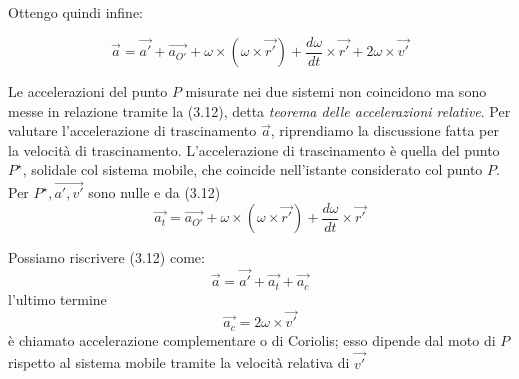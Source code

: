 \documentclass[class=book, crop=false, oneside, 12pt]{standalone}
\begin{document}
Ottengo quindi infine:

\begin{equation}
    \overrightarrow{a} = \overrightarrow{a'} + \overrightarrow{a_{O'}} + \omega \times ( \omega \times \overrightarrow{r'}) + \frac{d \omega}{dt} \times \overrightarrow{r'} + 2 \omega \times \overrightarrow{v'}
\end{equation}

Le accelerazioni del punto \(P\) misurate nei due sistemi non coincidono ma sono messe in relazione tramite la (3.12), detta \emph{teorema delle accelerazioni relative}.
Per valutare l'accelerazione di trascinamento \(\overrightarrow{a}\), riprendiamo la discussione fatta per la velocità di trascinamento. 
L'accelerazione di trascinamento è quella del punto \(P^{\star}\), solidale col sistema mobile, che coincide nell'istante considerato col punto \(P\). 
Per \(P^{\star}, \overrightarrow{a', v'}\) sono nulle e da (3.12)
\begin{equation}
    \overrightarrow{a_t} = \overrightarrow{a_{O'}} + \omega \times (\omega \times \overrightarrow{r'}) + \frac{d \omega }{dt} \times \overrightarrow{r'}
\end{equation}

Possiamo riscrivere (3.12) come:
\begin{equation*}
    \overrightarrow{a} = \overrightarrow{a'} + \overrightarrow{a_t} + \overrightarrow{a_c}
\end{equation*}
l'ultimo termine
\begin{equation*}
    \overrightarrow{a_c} = 2 \omega \times \overrightarrow{v'}
\end{equation*}
è chiamato accelerazione complementare o di Coriolis; esso dipende dal moto di \(P\) rispetto al sistema mobile tramite la velocità relativa di \(\overrightarrow{v'}\)
\end{document}
